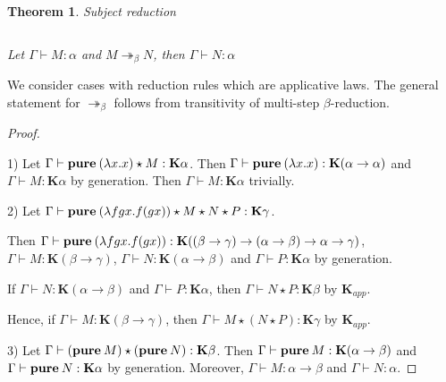 \documentclass[a4paper]{article}
\newtheorem{theorem}{Theorem}
\begin{document}
  \vspace{\baselineskip}

  \begin{theorem} Subject reduction

  $ $

  Let $\Gamma \vdash M : \alpha$ and $M \twoheadrightarrow_{\beta} N$, then $\Gamma \vdash N : \alpha$

  \end{theorem}

  We consider cases with reduction rules which are applicative laws. The general statement for $\twoheadrightarrow_{\beta}$ follows from transitivity of multi-step $\beta$-reduction.

  \begin{proof}

  $ $

\vspace{\baselineskip}

  1) Let $\Gamma \vdash {\bf pure \: } (\lambda x. x) \star M : \textbf{K}\alpha$. Then $\Gamma \vdash
  {\bf pure \: } (\lambda x.x) : \textbf{K}(\alpha \to \alpha)$ and $\Gamma \vdash M : \textbf{K}\alpha$ by
  generation. Then $\Gamma \vdash M : \textbf{K}\alpha$ trivially.

\vspace{\baselineskip}

  2) Let $\Gamma \vdash {\bf pure \: }(\lambda f g x. f (g x)) \star M \star N \star P : \textbf{K}\gamma$.

  Then $\Gamma \vdash {\bf pure \: } (\lambda f g x. f (g x)) : \textbf{K}((\beta \to \gamma) \to (\alpha \to \beta)
  \to \alpha \to \gamma)$, $\Gamma \vdash M : \textbf{K}(\beta \to \gamma)$, $\Gamma \vdash N :
  \textbf{K}(\alpha \to \beta)$ and $\Gamma \vdash P : \textbf{K}\alpha$ by generation.

  If $\Gamma \vdash N : \textbf{K}(\alpha \to \beta)$ and $\Gamma \vdash P : \textbf{K}\alpha$, then $\Gamma
  \vdash N \star P : \textbf{K}\beta$ by $\textbf{K}_{app}$.

  Hence, if $\Gamma \vdash M : \textbf{K}(\beta \to \gamma)$, then $\Gamma \vdash M \star (N \star P) :
  \textbf{K}\gamma$ by $\textbf{K}_{app}$.

\vspace{\baselineskip}

  3) Let $\Gamma \vdash ({\bf pure \: } M) \star ({\bf pure \: } N) : \textbf{K}\beta$. Then $\Gamma \vdash
  {\bf pure \: } M : \textbf{K}(\alpha \to \beta)$ and $\Gamma \vdash {\bf pure \: } N : \textbf{K}\alpha$ by
  generation. Moreover, $\Gamma \vdash M : \alpha \to \beta$ and $\Gamma \vdash N : \alpha$.


\end{proof}
\end{document}
